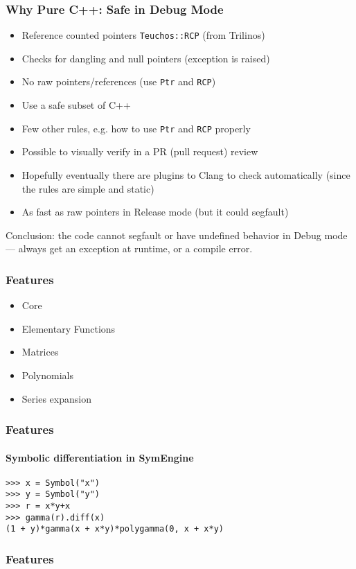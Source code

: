 \documentclass{beamer}
\begin{document}
\begin{frame}
\frametitle{Why Pure C++: Safe in Debug Mode}
\begin{itemize}
    \item Reference counted pointers \texttt{Teuchos::RCP} (from Trilinos)
    \item Checks for dangling and null pointers (exception is raised)
    \item No raw pointers/references (use \texttt{Ptr} and \texttt{RCP})
    \item Use a safe subset of C++
    \item Few other rules, e.g. how to use \texttt{Ptr} and \texttt{RCP}
          properly
    \item Possible to visually verify in a PR (pull request) review
    \item Hopefully eventually there are plugins to Clang to check
        automatically (since the rules are simple and static)
    \item As fast as raw pointers in Release mode (but it could segfault)
\end{itemize}
    Conclusion: the code cannot segfault or have undefined behavior in Debug
    mode --- always get an exception at runtime, or a compile error.
\end{frame}


\begin{frame}
\frametitle{Features}
\begin{itemize}
    \item Core
    \item Elementary Functions
    \item Matrices
    \item Polynomials
    \item Series expansion
\end{itemize}
\end{frame}


\begin{frame}[fragile]
\frametitle{Features}
\framesubtitle{Symbolic differentiation in SymEngine}
\begin{verbatim}
>>> x = Symbol("x")
>>> y = Symbol("y")
>>> r = x*y+x
>>> gamma(r).diff(x)
(1 + y)*gamma(x + x*y)*polygamma(0, x + x*y)
\end{verbatim}
\end{frame}


\begin{frame}
\frametitle{Features}
\end{frame}
\end{document}
